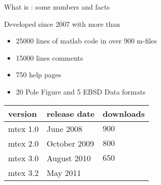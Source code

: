 \begin{frame}{What is \MTEX: some numbers and facts}


\begin{block}{}
Developed since 2007 with more than
\begin{itemize}
\item 25000 lines of matlab code in over 900 m-files
\item 15000 lines comments
\item 750 help pages
\item 20 Pole Figure and 5 EBSD Data formats
\end{itemize}
\end{block}

\begin{block}{}
  \vspace*{0.25em}
  \hspace{1.25em}
  \begin{tabular}{lll}
    version & release date & downloads \\
    \hline
    mtex 1.0 & June 2008 & $900$ \\
    mtex 2.0 & October 2009 & $800$ \\
    mtex 3.0 & August 2010 & $650$\\
    mtex 3.2 & May 2011 &
  \end{tabular}
\end{block}


\end{frame}







